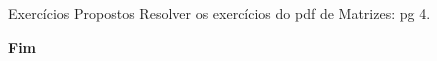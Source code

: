 \documentclass[aspectratio=169,xcolor=dvipsnames]{beamer}
\begin{document}

\begin{frame}{Exercícios Propostos}
  \centering Resolver os exercícios do pdf de Matrizes: pg 4.
  
\end{frame}



\begin{frame}
    \Huge{\centerline{\textbf{Fim}}}
\end{frame}

\end{document}
